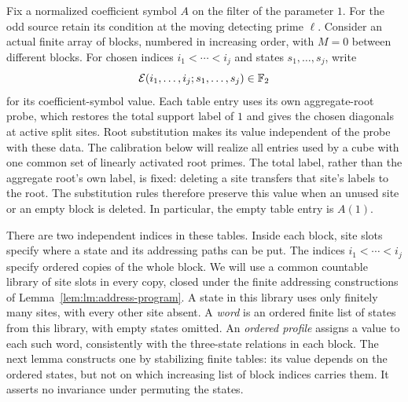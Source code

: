 Fix a normalized coefficient symbol $A$ on the filter of the parameter
$1$. For the odd source retain its condition at the moving detecting
prime $\ell$. Consider an actual finite array of blocks, numbered in
increasing order, with $M=0$ between different blocks. For chosen
indices $i_1<\cdots<i_j$ and states $s_1,\ldots,s_j$, write
\[
 \mathcal E(i_1,\ldots,i_j;s_1,\ldots,s_j)\in\mathbb F_2
\]
for its coefficient-symbol value. Each table entry uses its own
aggregate-root probe, which restores the total support label of $1$
and gives the chosen diagonals at active split sites. Root substitution
makes its value independent of the probe with these data. The calibration
below will realize all entries used by a cube with one common set of
linearly activated root primes. The total label, rather than the aggregate root's own label,
is fixed: deleting a site transfers that site's labels to the root.
The substitution rules therefore preserve this value when an unused
site or an empty block is deleted. In particular, the empty table entry
is $A(1)$.

There are two independent indices in these tables. Inside each block,
site slots specify where a state and its addressing paths can be put.
The indices $i_1<\cdots<i_j$ specify ordered copies of the whole block.
We will use a common countable library of site slots in every copy,
closed under the finite addressing constructions of
Lemma~\ref{lem:lm:address-program}. A state in this library uses only
finitely many sites, with every other site absent. A \emph{word} is an ordered finite
list of states from this library, with empty states omitted. An
\emph{ordered profile} assigns a value to each such word, consistently
with the three-state relations in each block. The next lemma constructs
one by stabilizing finite tables: its value depends on the ordered
states, but not on which increasing list of block indices carries them.
It asserts no invariance under permuting the states.

